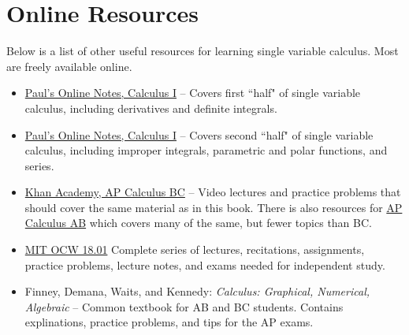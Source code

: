 \section{Online Resources}
Below is a list of other useful resources for learning single variable calculus.
Most are freely available online.

\begin{itemize}
	\item \href{https://tutorial.math.lamar.edu/Classes/CalcI/CalcI.aspx}{Paul's Online Notes, Calculus I} -- Covers first ``half" of single variable calculus, including derivatives and definite integrals.
	\item \href{https://tutorial.math.lamar.edu/Classes/CalcII/CalcII.aspx}{Paul's Online Notes, Calculus I} -- Covers second ``half" of single variable calculus, including improper integrals, parametric and polar functions, and series.
	\item \href{https://www.khanacademy.org/math/ap-calculus-bc}{Khan Academy, AP Calculus BC} -- Video lectures and practice problems that should cover the same material as in this book.
		There is also resources for \href{https://www.khanacademy.org/math/ap-calculus-ab}{AP Calculus AB} which covers many of the same, but fewer topics than BC.
	\item \href{https://ocw.mit.edu/courses/mathematics/18-01sc-single-variable-calculus-fall-2010/}{MIT OCW 18.01} Complete series of lectures, recitations, assignments, practice problems, lecture notes, and exams needed for independent study.
	\item Finney, Demana, Waits, and Kennedy: \textit{Calculus: Graphical, Numerical, Algebraic} -- Common textbook for AB and BC students.
		Contains explinations, practice problems, and tips for the AP exams.
\end{itemize}